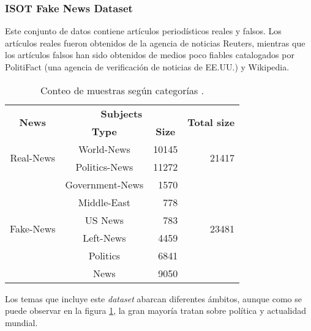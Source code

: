 \subsubsection{ISOT Fake News Dataset}

Este conjunto de datos contiene artículos periodísticos reales y falsos. Los artículos reales fueron obtenidos de la agencia de noticias Reuters, mientras que los artículos falsos han sido obtenidos de medios poco fiables catalogados por PolitiFact (una agencia de verificación de noticias de EE.UU.) y Wikipedia. 

\begin{table}[htb]
    \centering
    \begin{tabular}{ccrr}
        \hline
        \multirow{2}{*}{\textbf{News}} & \multicolumn{2}{c}{\textbf{Subjects}}                               & \multicolumn{1}{c}{\multirow{2}{*}{\textbf{Total size}}} \\
                                       & \footnotesize{\textbf{Type}} & \multicolumn{1}{c}{\footnotesize{\textbf{Size}}} & \multicolumn{1}{c}{}                               \\ \hline
        \multirow{2}{*}{Real-News} & World-News      & 10145 & \multirow{2}{*}{21417} \\
                                   & Politics-News   & 11272 &                        \\ \hline
        \multirow{6}{*}{Fake-News} & Government-News & 1570  & \multirow{6}{*}{23481} \\
                                   & Middle-East     & 778   &                        \\
                                   & US News         & 783   &                        \\
                                   & Left-News       & 4459  &                        \\
                                   & Politics        & 6841  &                        \\
                                   & News            & 9050  &                        \\ 
        \hline
    \end{tabular}
    \caption{Conteo de muestras según categorías \citep{Ahmed2017}.}
    \label{fig:news-dataset}
\end{table}


Los temas que incluye este \textit{dataset} abarcan diferentes ámbitos, aunque como se puede observar en la figura \ref{fig:news-dataset}, la gran mayoría tratan sobre política y actualidad mundial.

